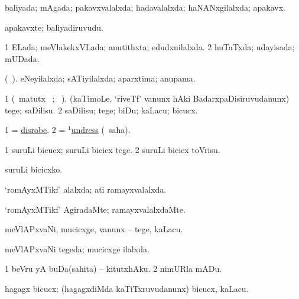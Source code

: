 \bentry
{} 
\gl{\gu}
\expl{}
\bmng
baliyada; mAgada; pakavxvalalxda; hadavalalxda; haNANxgilalxda; apakavx. 
\emng
\eentry

\bentry
{} 
\gl{\nA}
\expl{}
\bmng
apakavxte; baliyadiruvudu. 
\emng
\eentry

\bentry
{} 
\gl{\gu}
\expl{}
\bmng
\bnum
\num{1} ELada; meVlakekxVLada; anutithxta; edudxnilalxda. 
\num{2} huTaTxda; udayisada; mUDada. 
\enum
\emng
\eentry

\bentry
{} 
\gl{\gu}
\expl{}
\bmng
(\ame\ ). eNeyilalxda; sATiyilalxda; aparxtima; anupama. 
\emng
\eentry

\bentry
{} 
\gl{\sakirx}
\expl{}
\bmng
\bnum
\num{1} (\BU\ matutx \BUkaq\ ; \vakaq\ ). (kaTimoLe, `riveTf' \mo vanunx hAki BadarxpaDisiruvudanunx) tege; saDilisu. 
\num{2} saDilisu; tege; biDu; kaLacu; bicucx. 
\enum
\emng
\eentry

\bentry
{} 
\gl{\sakirx}
\expl{}
\bmng
\bnum
\num{1} = \hyperref{kandict_d.pdf}{D}{disrobe}{disrobe}. 
\num{2} = \hyperlink{undress(1)}{$^1$undress} (\akirx\ saha). 
\enum
\emng
\eentry

\bentry
{} 
\gl{\sakirx}
\expl{}
\bmng
\bnum
\num{1} suruLi bicucx; suruLi bicicx tege. 
\num{2} suruLi bicicx toVrisu. 
\enum
\emng

\noindent 
\gl{\akirx}
\expl{}
\bmng
suruLi bicicxko. 
\emng
\eentry

\bentry
{} 
\gl{\gu}
\expl{}
\bmng
`romAyxMTikf' alalxda; ati ramayxvalalxda. 
\emng
\eentry

\bentry
{} 
\gl{\kirxvi}
\expl{}
\bmng
`romAyxMTikf' AgiradaMte; ramayxvalalxdaMte. 
\emng
\eentry

\bentry
{} 
\gl{\akirx}
\expl{}
\bmng
meVlAPxvaNi, mucicxge, \mo vanunx -- tege, kaLacu. 
\emng
\eentry

\bentry
{} 
\gl{\gu}
\expl{}
\bmng
meVlAPxvaNi tegeda; mucicxge ilalxda. 
\emng
\eentry

\bentry
{} 
\gl{\sakirx}
\expl{}
\bmng
\bnum
\num{1} beVru yA buDa(sahita) -- kitutxhAku. 
\num{2} nimURla mADu. 
\enum
\emng
\eentry

\bentry
{} 
\gl{\akirx}
\expl{}
\bmng
hagagx bicucx; (hagagxdiMda kaTiTxruvudanunx) bicucx, kaLacu. 
\emng

